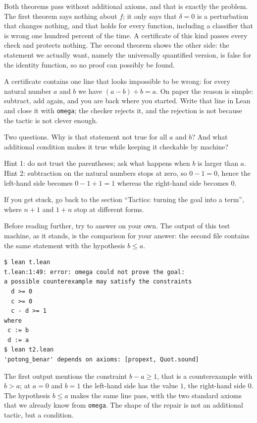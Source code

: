 Both theorems pass without additional axioms, and that is exactly the problem. The first theorem says
nothing about $f$; it only says that $\delta=0$ is a perturbation that changes nothing, and that
holds for every function, including a classifier that is wrong one hundred percent of the time. A
certificate of this kind passes every check and protects nothing. The second theorem shows the other
side: the statement we actually want, namely the universally quantified version, is false for the
identity function, so no proof can possibly be found.

\begin{tantangan}
A certificate contains one line that looks impossible to be wrong: for every natural number $a$ and
$b$ we have $(a-b)+b=a$. On paper the reason is simple: subtract, add again, and you are back where
you started. Write that line in Lean and close it with \texttt{omega}; the checker rejects it, and
the rejection is not because the tactic is not clever enough.

Two questions. Why is that statement not true for all $a$ and $b$? And what additional condition
makes it true while keeping it checkable by machine?

Hint 1: do not trust the parentheses; ask what happens when $b$ is larger than $a$. Hint 2:
subtraction on the natural numbers stops at zero, so $0-1=0$, hence the left-hand side becomes
$0-1+1=1$ whereas the right-hand side becomes $0$.

If you get stuck, go back to the section ``Tactics: turning the goal into a term'', where $n+1$ and
$1+n$ stop at different forms.
\end{tantangan}

Before reading further, try to answer on your own. The output of this test machine, as it stands, is
the comparison for your answer: the second file contains the same statement with the hypothesis
$b\le a$.

\begin{verbatim}
$ lean t.lean
t.lean:1:49: error: omega could not prove the goal:
a possible counterexample may satisfy the constraints
  d >= 0
  c >= 0
  c - d >= 1
where
 c := b
 d := a
$ lean t2.lean
'potong_benar' depends on axioms: [propext, Quot.sound]
\end{verbatim}

The first output mentions the constraint $b-a\ge 1$, that is a counterexample with $b>a$; at $a=0$
and $b=1$ the left-hand side has the value $1$, the right-hand side $0$. The hypothesis $b\le a$
makes the same line pass, with the two standard axioms that we already know from \texttt{omega}. The
shape of the repair is not an additional tactic, but a condition.

